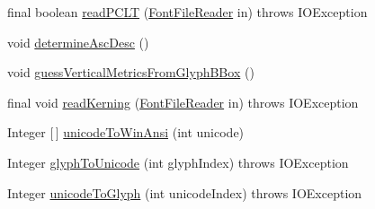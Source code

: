 \begin{DoxyCompactItemize}
\item 
final boolean \mbox{\hyperlink{classorg_1_1newdawn_1_1slick_1_1tools_1_1hiero_1_1truetype_1_1_t_t_f_file_a8b47fdea5a7d13b9c0dac2fa7ae19031}{read\+P\+C\+LT}} (\mbox{\hyperlink{classorg_1_1newdawn_1_1slick_1_1tools_1_1hiero_1_1truetype_1_1_font_file_reader}{Font\+File\+Reader}} in)  throws I\+O\+Exception 
\item 
void \mbox{\hyperlink{classorg_1_1newdawn_1_1slick_1_1tools_1_1hiero_1_1truetype_1_1_t_t_f_file_a804c8fe0fd2e1ff9402b60bed17d6b41}{determine\+Asc\+Desc}} ()
\item 
void \mbox{\hyperlink{classorg_1_1newdawn_1_1slick_1_1tools_1_1hiero_1_1truetype_1_1_t_t_f_file_ab41aa5e8c2abae89c348a00e990174fa}{guess\+Vertical\+Metrics\+From\+Glyph\+B\+Box}} ()
\item 
final void \mbox{\hyperlink{classorg_1_1newdawn_1_1slick_1_1tools_1_1hiero_1_1truetype_1_1_t_t_f_file_a84c34bf27af35601c788863c3700c406}{read\+Kerning}} (\mbox{\hyperlink{classorg_1_1newdawn_1_1slick_1_1tools_1_1hiero_1_1truetype_1_1_font_file_reader}{Font\+File\+Reader}} in)  throws I\+O\+Exception 
\item 
Integer \mbox{[}$\,$\mbox{]} \mbox{\hyperlink{classorg_1_1newdawn_1_1slick_1_1tools_1_1hiero_1_1truetype_1_1_t_t_f_file_a20efa0bc697dd6dedcaa08b66eaa4660}{unicode\+To\+Win\+Ansi}} (int unicode)
\item 
Integer \mbox{\hyperlink{classorg_1_1newdawn_1_1slick_1_1tools_1_1hiero_1_1truetype_1_1_t_t_f_file_a01cadde9555e784b3ff8cceb88d8eba0}{glyph\+To\+Unicode}} (int glyph\+Index)  throws I\+O\+Exception 
\item 
Integer \mbox{\hyperlink{classorg_1_1newdawn_1_1slick_1_1tools_1_1hiero_1_1truetype_1_1_t_t_f_file_a32307b9061a332f3bf5bc5a8a3f1543f}{unicode\+To\+Glyph}} (int unicode\+Index)  throws I\+O\+Exception 
\end{DoxyCompactItemize}
